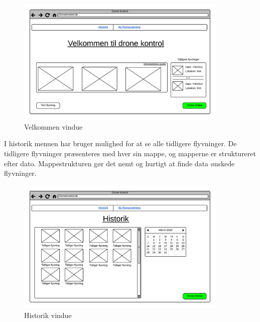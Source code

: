 \vspace{-5pt}
 \begin{figure}[H]
 	\centering
 	\includegraphics[width=0.9\textwidth]{Billeder/UI_mockups/index.png}
 	\vspace{-.5cm}
 	\caption{Velkommen vindue}
 	\label{fig:mockup_welcome}
 \end{figure} 

I historik menuen har bruger mulighed for at se alle tidligere flyvninger. De tidligere flyvninger præsenteres med hver sin mappe, og mapperne er struktureret efter dato. Mappestrukturen gør det nemt og hurtigt at finde data ønskede flyvninger.

\vspace{-5pt}
\begin{figure}[H]
	\centering
	\includegraphics[width=0.9\textwidth]{Billeder/UI_mockups/archive.png}
	\vspace{-.5cm}
	\caption{Historik vindue}
	\label{fig:mockup_archive}
\end{figure}

\newpage

